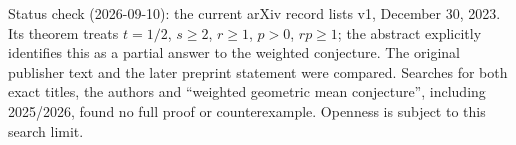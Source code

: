\documentclass[11pt,a4paper]{article}
\begin{document}
Status check (2026-09-10): the current arXiv record lists v1, December
30, 2023. Its theorem treats \(t=1/2\), \(s\ge2\), \(r\ge1\), \(p>0\),
\(rp\ge1\); the abstract explicitly identifies this as a partial answer
to the weighted conjecture. The original publisher text and the later
preprint statement were compared. Searches for both exact titles, the
authors and ``weighted geometric mean conjecture'', including 2025/2026,
found no full proof or counterexample. Openness is subject to this
search limit.
\end{document}
